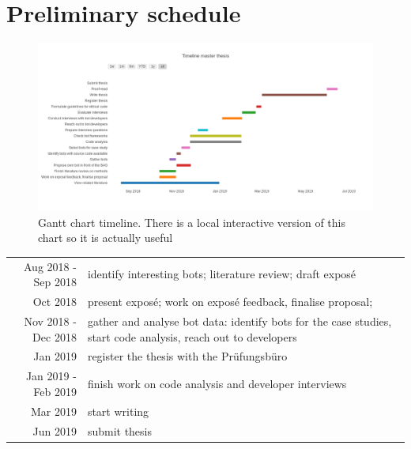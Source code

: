 \documentclass[pdftex,a4paper,11pt]{scrartcl}
\begin{document}
\section{Preliminary schedule}

\begin{figure}[!h]
	\centering
		\includegraphics[width=1\textwidth]{../charts/gantt-thesis.png}
    \caption{Gantt chart timeline. There is a local interactive version of this chart so it is actually useful}
\end{figure}

\begin{tabular}{r p{11cm}}
    Aug 2018 - Sep 2018 & identify interesting bots; literature review; draft exposé \\
           Oct 2018 & present exposé; work on exposé feedback, finalise proposal;\\
    Nov 2018 - Dec 2018 & gather and analyse bot data: identify bots for the case studies, start code analysis, reach out to developers \\
           Jan 2019 & register the thesis with the Prüfungsbüro \\
Jan 2019 - Feb 2019 & finish work on code analysis and developer interviews \\
           Mar 2019 & start writing \\
           Jun 2019 & submit thesis \\
\end{tabular}

{}   %

\end{document}
